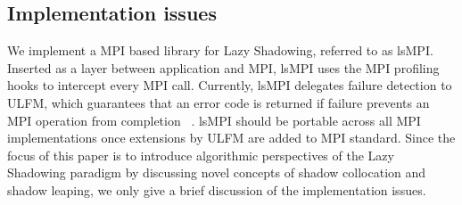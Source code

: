 \subsection{Implementation issues}

%

We implement a MPI based library for Lazy Shadowing, referred to as lsMPI. Inserted as a layer between application and MPI, lsMPI uses the MPI profiling hooks to intercept every MPI call. Currently, lsMPI 
delegates failure detection to ULFM, which guarantees that an error code is returned if failure prevents 
an MPI operation from completion
~\cite{Bland:2012:EUF:2404033.2404064,bland2013post}. 
lsMPI should be portable across all MPI implementations once extensions by ULFM are added to MPI standard.
Since the focus of this paper is to introduce
algorithmic perspectives of the Lazy Shadowing paradigm by discussing novel concepts of shadow collocation and shadow leaping, we only give a brief discussion of the implementation issues. 

